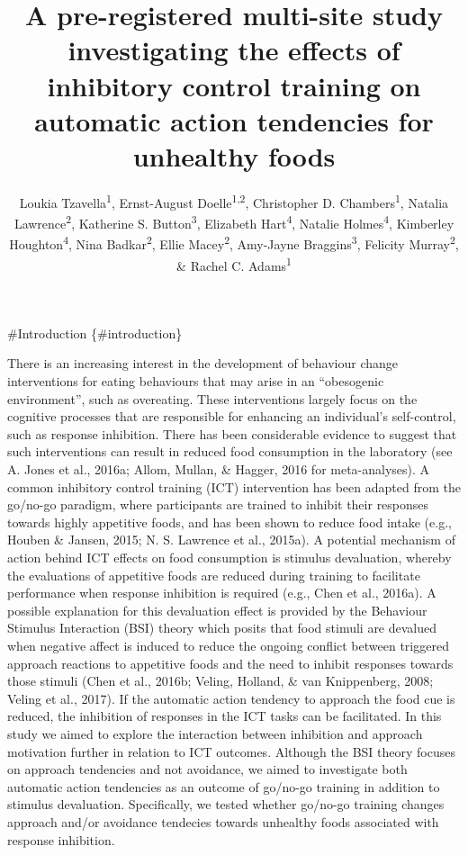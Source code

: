 \documentclass[man,floatsintext]{apa6}
\title{A pre-registered multi-site study investigating the effects of inhibitory control training on automatic action tendencies for unhealthy foods}
\author{Loukia Tzavella\textsuperscript{1}, Ernst-August Doelle\textsuperscript{1,2}, Christopher D. Chambers\textsuperscript{1}, Natalia Lawrence\textsuperscript{2}, Katherine S. Button\textsuperscript{3}, Elizabeth Hart\textsuperscript{4}, Natalie Holmes\textsuperscript{4}, Kimberley Houghton\textsuperscript{4}, Nina Badkar\textsuperscript{2}, Ellie Macey\textsuperscript{2}, Amy-Jayne Braggins\textsuperscript{3}, Felicity Murray\textsuperscript{2}, \& Rachel C. Adams\textsuperscript{1}}
\date{}
\affiliation{
\vspace{0.5cm}
\textsuperscript{1} Cardiff University Brain Research Imaging Centre, CF24 4HQ, UK\\\textsuperscript{2} School of Psychology, University of Exeter, EX4 4QG, UK\\\textsuperscript{3} Department of Psychology, University of Bath, BS2 7AY, UK\\\textsuperscript{4} School of Psychology, Cardiff University, CF10 3AT, UK}
\begin{document}
\maketitle

\#Introduction \{\#introduction\}

\par

There is an increasing interest in the development of behaviour change interventions for eating behaviours that may arise in an \enquote{obesogenic environment}, such as overeating. These interventions largely focus on the cognitive processes that are responsible for enhancing an individual's self-control, such as response inhibition. There has been considerable evidence to suggest that such interventions can result in reduced food consumption in the laboratory (see A. Jones et al., 2016a; Allom, Mullan, \& Hagger, 2016 for meta-analyses). A common inhibitory control training (ICT) intervention has been adapted from the go/no-go paradigm, where participants are trained to inhibit their responses towards highly appetitive foods, and has been shown to reduce food intake (e.g., Houben \& Jansen, 2015; N. S. Lawrence et al., 2015a). A potential mechanism of action behind ICT effects on food consumption is stimulus devaluation, whereby the evaluations of appetitive foods are reduced during training to facilitate performance when response inhibition is required (e.g., Chen et al., 2016a). A possible explanation for this devaluation effect is provided by the Behaviour Stimulus Interaction (BSI) theory which posits that food stimuli are devalued when negative affect is induced to reduce the ongoing conflict between triggered approach reactions to appetitive foods and the need to inhibit responses towards those stimuli (Chen et al., 2016b; Veling, Holland, \& van Knippenberg, 2008; Veling et al., 2017). If the automatic action tendency to approach the food cue is reduced, the inhibition of responses in the ICT tasks can be facilitated. In this study we aimed to explore the interaction between inhibition and approach motivation further in relation to ICT outcomes. Although the BSI theory focuses on approach tendencies and not avoidance, we aimed to investigate both automatic action tendencies as an outcome of go/no-go training in addition to stimulus devaluation. Specifically, we tested whether go/no-go training changes approach and/or avoidance tendecies towards unhealthy foods associated with response inhibition.

\par
\end{document}
